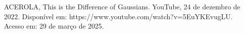 \begin{thebibliography}{99}

ACEROLA, This is the Difference of Gaussians. YouTube, 24 de dezembro de 2022. Disponível em: https://www.youtube.com/watch?v=5EuYKEvugLU. Acesso em: 29 de março de 2025.

\end{thebibliography}